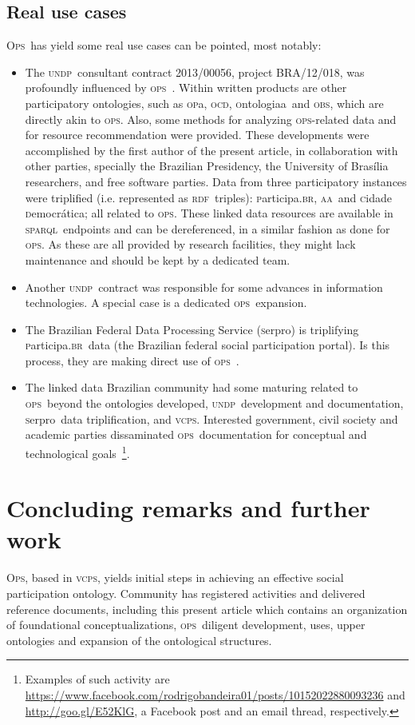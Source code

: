 \documentclass[10pt,letterpaper]{article}
\newcommand{\ops}{\textsc{ops}}
\newcommand{\opsi}{O\textsc{ps}}
\newcommand{\vcps}{\textsc{vcps}}
\newcommand{\sparql}{\textsc{sparql}}
\newcommand{\opa}{\textsc{op}a}
\newcommand{\ocd}{\textsc{ocd}}
\newcommand{\ontologiaa}{\textsc{o}ntologiaa}
\newcommand{\obs}{\textsc{obs}}
\newcommand{\rdf}{\textsc{rdf}}
\newcommand{\aan}{\textsc{aa}}
\newcommand{\cidadedemocratica}{\textsc{c}idade \textsc{d}emocr\'atica}
\newcommand{\participa}{\textsc{p}articipa.\textsc{br}}
\newcommand{\pnud}{\textsc{undp}}
\newcommand{\serpro}{\textsc{s}erpro}
\begin{document}
\subsection{Real use cases}\label{sec:real}
\opsi\ has yield some real use cases can be pointed, most notably:
\begin{itemize}
    \item The \pnud\ consultant contract 2013/00056, project BRA/12/018,
    was profoundly influenced by \ops~\cite{pnud5}.
    Within written products are other participatory ontologies,
    such as \opa, \ocd, \ontologiaa\ and \obs,
    which are directly akin to \ops.
    Also, some methods for analyzing \ops-related data and for resource recommendation were provided.
    These developments were accomplished by the first author of the present article,
    in collaboration with other parties, specially the Brazilian Presidency,
    the University of Bras\'ilia researchers, and free software parties.
    Data from three participatory instances were triplified (i.e. represented as \rdf\ triples):
    \participa, \aan\ and \cidadedemocratica; all related to \ops.
    These linked data resources are available in \sparql\ endpoints and can be dereferenced,
    in a similar fashion as done for \ops.
    As these are all provided by research facilities,
    they might lack maintenance and should be kept by a dedicated team.
    \item Another \pnud\ contract was responsible for some advances in information technologies.
    A special case is a dedicated \ops\ expansion\cite{paulo6}.
    \item The Brazilian Federal Data Processing Service (\serpro) is triplifying \participa\ data 
    (the Brazilian federal social participation portal). Is this process, they are making direct use of \ops~\cite{tripSerpro}.
    \item The linked data Brazilian community had some maturing related to \ops\ beyond the ontologies developed,
    \pnud\ development and documentation, \serpro\ data triplification, and \vcps.
    Interested government, civil society and academic parties dissaminated \ops\
    documentation for conceptual and technological goals~\footnote{
      Examples of such activity are \url{https://www.facebook.com/rodrigobandeira01/posts/10152022880093236} and \url{http://goo.gl/E52KlG}, a Facebook post and an email thread, respectively.
    }.
\end{itemize}

\section{Concluding remarks and further work}\label{conc}
\opsi, based in \vcps,
yields initial steps in achieving an effective social participation ontology.
Community has registered activities and delivered reference documents,
including this present article which contains 
an organization of foundational conceptualizations,
\ops\ diligent development, uses,
upper ontologies and expansion of the ontological structures.
\end{document}
